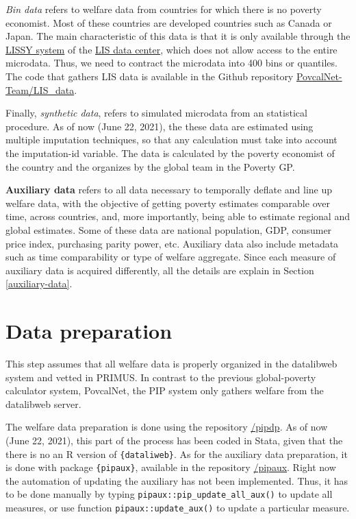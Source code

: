 \documentclass[
]{book}
\begin{document}
\emph{Bin data} refers to welfare data from countries for which there is no poverty
economist. Most of these countries are developed countries such as Canada or
Japan. The main characteristic of this data is that it is only available through
the \href{https://www.lisdatacenter.org/data-access/lissy/}{LISSY system} of the \href{https://www.lisdatacenter.org/}{LIS
data center}, which does not allow access to the
entire microdata. Thus, we need to contract the microdata into 400 bins or
quantiles. The code that gathers LIS data is available in the Github repository
\href{https://github.com/PovcalNet-Team/LIS_data}{PovcalNet-Team/LIS\_data}.

Finally, \emph{synthetic data}, refers to simulated microdata from an statistical
procedure. As of now (June 22, 2021), the these data are
estimated using multiple imputation techniques, so that any calculation must
take into account the imputation-id variable. The data is calculated by the
poverty economist of the country and the organizes by the global team in the
Poverty GP.

\textbf{Auxiliary data} refers to all data necessary to temporally deflate and line
up welfare data, with the objective of getting poverty estimates comparable over
time, across countries, and, more importantly, being able to estimate regional
and global estimates. Some of these data are national population, GDP, consumer
price index, purchasing parity power, etc. Auxiliary data also include metadata
such as time comparability or type of welfare aggregate. Since each measure of
auxiliary data is acquired differently, all the details are explain in Section
\ref{auxiliary-data}.

\hypertarget{data-preparation}{%
\section{Data preparation}\label{data-preparation}}

This step assumes that all welfare data is properly organized in the datalibweb
system and vetted in PRIMUS. In contrast to the previous global-poverty
calculator system, PovcalNet, the PIP system only gathers welfare from the
datalibweb server.

The welfare data preparation is done using the repository
\href{https://github.com/PIP-Technical-Team/pipdp}{/pipdp}. As of now
(June 22, 2021), this part of the process has been coded
in Stata, given that the there is no an R version of \texttt{\{dataliweb\}}. As for the
auxiliary data preparation, it is done with package \texttt{\{pipaux\}}, available in the
repository \href{https://github.com/PIP-Technical-Team/pipaux}{/pipaux}. Right now
the automation of updating the auxiliary has not been implemented. Thus, it has
to be done manually by typing \texttt{pipaux::pip\_update\_all\_aux()} to update all
measures, or use function \texttt{pipaux::update\_aux()} to update a particular measure.
\end{document}
